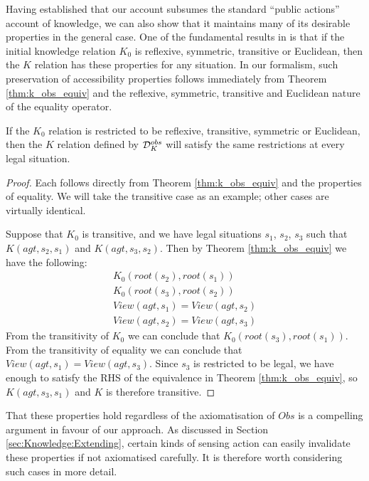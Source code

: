 Having established that our account subsumes the standard {}``public
actions'' account of knowledge, we can also show that it maintains
many of its desirable properties in the general case. One of the fundamental
results in \citep{scherl03sc_knowledge} is that if the initial knowledge
relation $K_{0}$ is reflexive, symmetric, transitive or Euclidean,
then the $K$ relation has these properties for any situation. In
our formalism, such preservation of accessibility properties follows
immediately from Theorem \ref{thm:k_obs_equiv} and the reflexive,
symmetric, transitive and Euclidean nature of the equality operator.

\begin{thm}
If the $K_{0}$ relation is restricted to be reflexive, transitive,
symmetric or Euclidean, then the $K$ relation defined by $\mathcal{D}_{K}^{obs}$
will satisfy the same restrictions at every legal situation. \label{thm:Knowledge:Accessibility} 
\end{thm}
\begin{proof}
Each follows directly from Theorem \ref{thm:k_obs_equiv} and the
properties of equality. We will take the transitive case as an example;
other cases are virtually identical.

Suppose that $K_{0}$ is transitive, and we have legal situations
$s_{1}$, $s_{2}$, $s_{3}$ such that $K(agt,s_{2},s_{1})$ and $K(agt,s_{3},s_{2})$.
Then by Theorem \ref{thm:k_obs_equiv} we have the following:\begin{gather*}
K_{0}(root(s_{2}),root(s_{1}))\\
K_{0}(root(s_{3}),root(s_{2}))\\
View(agt,s_{1})=View(agt,s_{2})\\
View(agt,s_{2})=View(agt,s_{3})\end{gather*}
 From the transitivity of $K_{0}$ we can conclude that $K_{0}(root(s_{3}),root(s_{1}))$.
From the transitivity of equality we can conclude that $View(agt,s_{1})=View(agt,s_{3})$.
Since $s_{3}$ is restricted to be legal, we have enough to satisfy
the RHS of the equivalence in Theorem \ref{thm:k_obs_equiv}, so $K(agt,s_{3},s_{1})$
and $K$ is therefore transitive. 
\end{proof}
That these properties hold regardless of the axiomatisation of $Obs$
is a compelling argument in favour of our approach. As discussed in
Section \ref{sec:Knowledge:Extending}, certain kinds of sensing action
can easily invalidate these properties if not axiomatised carefully.
It is therefore worth considering such cases in more detail.

